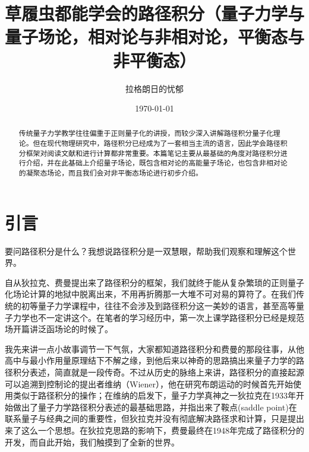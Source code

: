 \documentclass[12pt, a4paper, oneside]{ctexart}
\begin{document}
\title{\textbf{草履虫都能学会的路径积分（量子力学与量子场论，相对论与非相对论，平衡态与非平衡态）}}
\author{拉格朗日的忧郁}
\date{\today}
\linespread{1.5}

\renewcommand{\abstractname}{\Large\textbf{摘要}}


\maketitle

\setcounter{page}{0}
\maketitle
\thispagestyle{empty}

\begin{abstract}
传统量子力学教学往往偏重于正则量子化的讲授，而较少深入讲解路径积分量子化理论。但在现代物理研究中，路径积分已经成为了一套相当主流的语言，因此学会路径积分框架对阅读文献和进行计算都非常重要。本篇笔记主要从最基础的角度对路径积分进行介绍，并在此基础上介绍量子场论，既包含相对论的高能量子场论，也包含非相对论的凝聚态场论，而且我们会对非平衡态场论进行初步介绍。
\end{abstract}

\newpage

\setcounter{page}{1}
\tableofcontents
\newpage
\setcounter{page}{1}

\section{引言}
要问路径积分是什么？我想说路径积分是一双慧眼，帮助我们观察和理解这个世界。

自从狄拉克、费曼提出来了路径积分的框架，我们就终于能从复杂繁琐的正则量子化场论计算的地狱中脱离出来，不用再折腾那一大堆不可对易的算符了。在我们传统的初等量子力学课程中，往往不会涉及到路径积分这一美妙的语言，甚至高等量子力学也不一定讲这个。在笔者的学习经历中，第一次上课学路径积分已经是规范场开篇讲泛函场论的时候了。

我先来讲一点小故事调节一下气氛，大家都知道路径积分和费曼的那段往事，从他高中与最小作用量原理结下不解之缘，到他后来以神奇的思路搞出来量子力学的路径积分表述，简直就是一段传奇。不过从历史的脉络上来讲，路径积分的直接起源可以追溯到控制论的提出者维纳（Wiener），他在研究布朗运动的时候首先开始使用类似于路径积分的操作；在维纳的启发下，量子力学真神之一狄拉克在1933年开始做出了量子力学路径积分表述的最基础思路，并指出来了鞍点(saddle point)在联系量子与经典之间的重要性，但狄拉克并没有彻底解决路径求和计算，只是提出来了这么一个思想。在狄拉克思路的影响下，费曼最终在1948年完成了路径积分的开发，而自此开始，我们触摸到了全新的世界。
\end{document}
